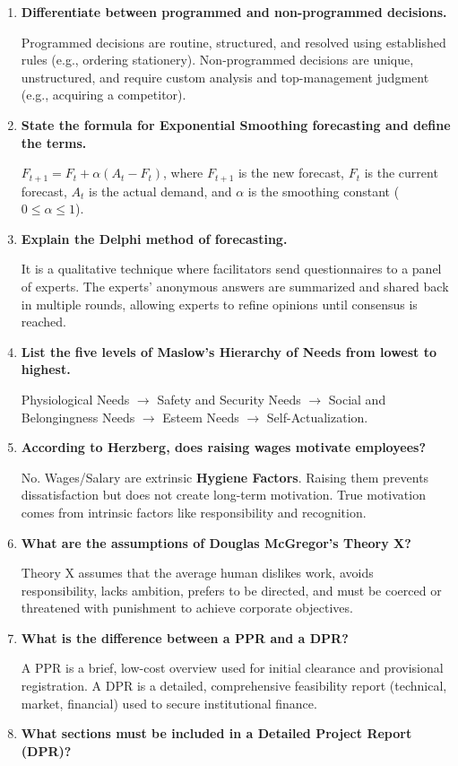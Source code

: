 \documentclass[12pt,a4paper]{article}
\newcommand{\Q}[1]{\textbf{#1}\par\noindent\ignorespaces}
\begin{document}
\begin{tcolorbox}[exambox, title={\textbf{Frequently Asked / Viva Questions}}]
\begin{enumerate}[topsep=0pt, label=\textbf{Q\arabic*.}, itemsep=5pt]
  \item \Q{Differentiate between programmed and non-programmed decisions.}
    Programmed decisions are routine, structured, and resolved using established rules (e.g., ordering stationery). Non-programmed decisions are unique, unstructured, and require custom analysis and top-management judgment (e.g., acquiring a competitor).
  \item \Q{State the formula for Exponential Smoothing forecasting and define the terms.}
    $F_{t+1} = F_t + \alpha (A_t - F_t)$, where $F_{t+1}$ is the new forecast, $F_t$ is the current forecast, $A_t$ is the actual demand, and $\alpha$ is the smoothing constant ($0 \le \alpha \le 1$).
  \item \Q{Explain the Delphi method of forecasting.}
    It is a qualitative technique where facilitators send questionnaires to a panel of experts. The experts' anonymous answers are summarized and shared back in multiple rounds, allowing experts to refine opinions until consensus is reached.
  \item \Q{List the five levels of Maslow's Hierarchy of Needs from lowest to highest.}
    Physiological Needs $\rightarrow$ Safety and Security Needs $\rightarrow$ Social and Belongingness Needs $\rightarrow$ Esteem Needs $\rightarrow$ Self-Actualization.
  \item \Q{According to Herzberg, does raising wages motivate employees?}
    No. Wages/Salary are extrinsic \textbf{Hygiene Factors}. Raising them prevents dissatisfaction but does not create long-term motivation. True motivation comes from intrinsic factors like responsibility and recognition.
  \item \Q{What are the assumptions of Douglas McGregor's Theory X?}
    Theory X assumes that the average human dislikes work, avoids responsibility, lacks ambition, prefers to be directed, and must be coerced or threatened with punishment to achieve corporate objectives.
  \item \Q{What is the difference between a PPR and a DPR?}
    A PPR is a brief, low-cost overview used for initial clearance and provisional registration. A DPR is a detailed, comprehensive feasibility report (technical, market, financial) used to secure institutional finance.
  \item \Q{What sections must be included in a Detailed Project Report (DPR)?}

\end{enumerate}
\end{tcolorbox}
\end{document}

